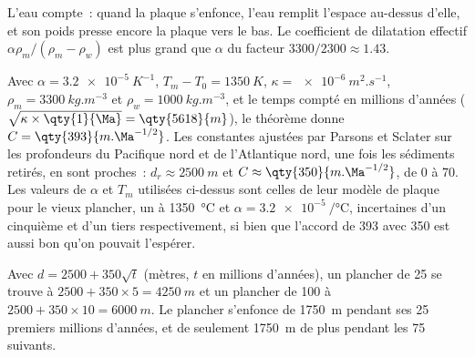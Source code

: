L'eau compte~: quand la plaque s'enfonce, l'eau remplit l'espace au-dessus d'elle, et son
poids presse encore la plaque vers le bas. Le coefficient de dilatation effectif
$\alpha\rho_m/(\rho_m - \rho_w)$ est plus grand que $\alpha$ du facteur
$3300/2300 \approx 1.43$.

Avec $\alpha = \qty{3.2e-5}{K^{-1}}$, $T_m - T_0 = \qty{1350}{K}$,
$\kappa = \qty{e-6}{m^2.s^{-1}}$, $\rho_m = \qty{3300}{kg.m^{-3}}$ et
$\rho_w = \qty{1000}{kg.m^{-3}}$, et le temps compté en millions d'années
($\sqrt{\kappa\times\qty{1}{\Ma}} = \qty{5618}{m}$), le théorème donne
$C = \qty{393}{m.\Ma^{-1/2}}$. Les constantes ajustées par Parsons et Sclater sur
les profondeurs du Pacifique nord et de l'Atlantique nord, une fois les sédiments
retirés, en sont proches~: $d_r \approx \qty{2500}{m}$ et
$C \approx \qty{350}{m.\Ma^{-1/2}}$, de 0 à \qty{70}{\Ma}. Les valeurs de
$\alpha$ et $T_m$ utilisées ci-dessus sont celles de leur modèle de plaque pour le vieux plancher,
un  à \qty{1350}{\degreeCelsius} et
$\alpha = \qty{3.2e-5}{\per\degreeCelsius}$, incertaines d'un cinquième et d'un tiers
respectivement, si bien que l'accord de 393 avec 350 est aussi bon qu'on pouvait
l'espérer.

\begin{example}\label{ex:b1:rifts-ridges-margins:depths}
Avec $d = 2500 + 350\sqrt t$ (mètres, $t$ en millions d'années), un plancher
de \qty{25}{\Ma} se trouve à $2500 + 350\times5 = \qty{4250}{m}$ et un plancher
de \qty{100}{\Ma} à $2500 + 350\times10 = \qty{6000}{m}$. Le plancher s'enfonce de
\qty{1750}{m} pendant ses 25 premiers millions d'années, et de seulement \qty{1750}{m} de plus pendant
les 75 suivants.
\end{example}

